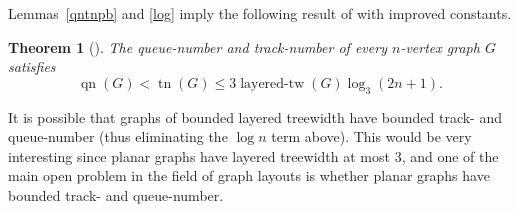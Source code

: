 \documentclass[a4paper,11pt]{article}
\DeclareMathOperator{\tn}{tn}
\DeclareMathOperator{\qn}{qn}
\DeclareMathOperator{\tb}{layered-tw}
\theoremstyle{plain}
\newtheorem{theorem}{Theorem}
\theoremstyle{definition}
\begin{document}
Lemmas~\ref{qntnpb} and \ref{log} imply the following result of \citet{Duj15} with improved constants.

\begin{theorem}[\citep{Duj15}]
The queue-number and track-number of every $n$-vertex graph $G$ satisfies
$$\qn(G)<\tn(G)\leq 3\tb(G)\log_3(2n+1).$$ 
\end{theorem}

It is possible that graphs of bounded layered treewidth have bounded track- and queue-number (thus eliminating the $\log n$ term above). This would be very interesting since planar graphs have layered treewidth at most 3, and one of the main open problem in the field of graph layouts is whether planar graphs have bounded track- and queue-number. 


%
%
%
%
%
%
%
%
%
%
%
\end{document}

